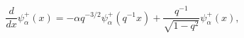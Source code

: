 \begin{equation}\label{pant}
\frac{d}{dx}\psi_\alpha^+(x)=-\alpha q^{-3/2}\psi_\alpha^+(q^{-1}x)
+\frac{q^{-1}}{\sqrt{1-q^2}}\psi_\alpha^+(x),
\end{equation}

